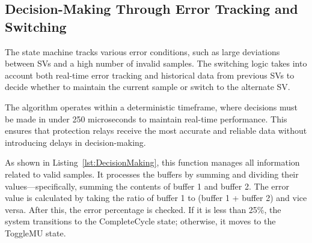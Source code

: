 \subsection{Decision-Making Through Error Tracking and Switching}
The state machine tracks various error conditions, such as large deviations between SVs and a high number of invalid samples. The switching logic takes into account both real-time error tracking and historical data from previous SVs to decide whether to maintain the current sample or switch to the alternate SV.

The algorithm operates within a deterministic timeframe, where decisions must be made in under 250 microseconds to maintain real-time performance. This ensures that protection relays receive the most accurate and reliable data without introducing delays in decision-making.

As shown in Listing~\ref{lst:DecisionMaking}, this function manages all information related to valid samples. It processes the buffers by summing and dividing their values—specifically, summing the contents of buffer 1 and buffer 2. The error value is calculated by taking the ratio of buffer 1 to (buffer 1 + buffer 2) and vice versa. After this, the error percentage is checked. If it is less than 25\%, the system transitions to the CompleteCycle state; otherwise, it moves to the ToggleMU state.

